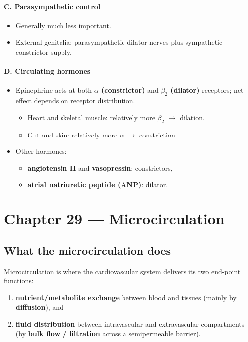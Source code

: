 \documentclass[11pt,a4paper]{article}
\begin{document}
\paragraph{C. Parasympathetic control}
\begin{itemize}
\item Generally much less important.
\item External genitalia: parasympathetic dilator nerves plus sympathetic constrictor supply.
\end{itemize}

\paragraph{D. Circulating hormones}
\begin{itemize}
\item Epinephrine acts at both \textbf{$\alpha$ (constrictor)} and \textbf{$\beta_2$ (dilator)} receptors; net effect depends on receptor distribution.
  \begin{itemize}
  \item Heart and skeletal muscle: relatively more $\beta_2$ $\rightarrow$ dilation.
  \item Gut and skin: relatively more $\alpha$ $\rightarrow$ constriction.
  \end{itemize}
\item Other hormones:
  \begin{itemize}
  \item \textbf{angiotensin II} and \textbf{vasopressin}: constrictors,
  \item \textbf{atrial natriuretic peptide (ANP)}: dilator.
  \end{itemize}
\end{itemize}


\section{Chapter 29 --- Microcirculation}

\subsection{What the microcirculation does}
Microcirculation is where the cardiovascular system delivers its two end-point functions:
\begin{enumerate}
\item \textbf{nutrient/metabolite exchange} between blood and tissues (mainly by \textbf{diffusion}), and
\item \textbf{fluid distribution} between intravascular and extravascular compartments (by \textbf{bulk flow / filtration} across a semipermeable barrier).
\end{enumerate}
\end{document}
